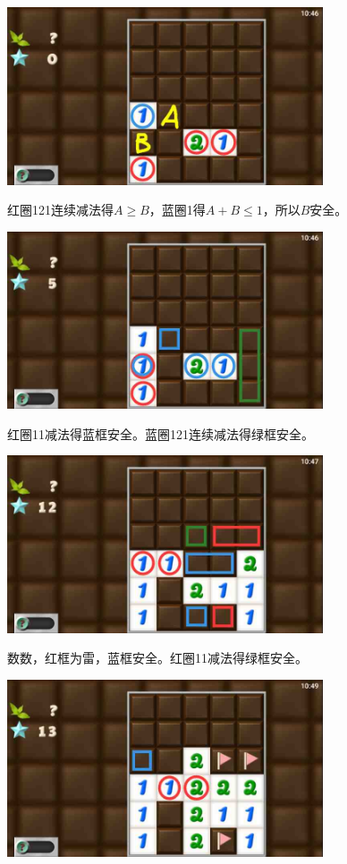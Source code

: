 \subsection{} %
\begin{center}
    \includegraphics[width=0.7\textwidth]{puzzlelow/182-1.jpg}
\end{center}
红圈121连续减法得$A\ge B$，蓝圈1得$A+B\le 1$，所以$B$安全。
\begin{center}
    \includegraphics[width=0.7\textwidth]{puzzlelow/182-2.jpg}
\end{center}
红圈11减法得蓝框安全。蓝圈121连续减法得绿框安全。
\begin{center}
    \includegraphics[width=0.7\textwidth]{puzzlelow/182-3.jpg}
\end{center}
数数，红框为雷，蓝框安全。红圈11减法得绿框安全。
\begin{center}
    \includegraphics[width=0.7\textwidth]{puzzlelow/182-4.jpg}
\end{center}
